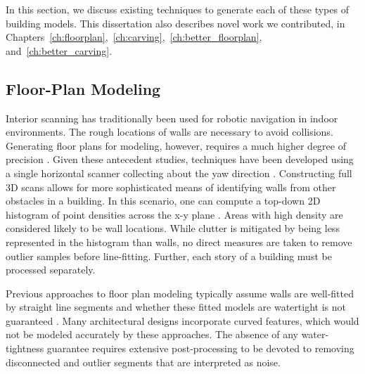 \documentclass[12pt,onecolumn,oneside]{book}
\begin{document}
In this section, we discuss existing techniques to generate each of these types of building models.  This dissertation also describes novel work we contributed, in Chapters~\ref{ch:floorplan},~\ref{ch:carving},~\ref{ch:better_floorplan}, and~\ref{ch:better_carving}.

\subsection{Floor-Plan Modeling}
\label{ssec:background_floorplan}

Interior scanning has traditionally been used for robotic navigation in indoor environments.  The rough locations of walls are necessary to avoid collisions.  Generating floor plans for modeling, however, requires a much higher degree of precision \cite{Okorn09}.  Given these antecedent studies, techniques have been developed using a single horizontal scanner collecting about the yaw direction \cite{Weiss05}.  Constructing full 3D scans allows for more sophisticated means of identifying walls from other obstacles in a building.  In this scenario, one can compute a top-down 2D histogram of point densities across the x-y plane \cite{Okorn09}.  Areas with high density are considered likely to be wall locations.  While clutter is mitigated by being less represented in the histogram than walls, no direct measures are taken to remove outlier samples before line-fitting.  Further, each story of a building must be processed separately.

Previous approaches to floor plan modeling typically assume walls are well-fitted by straight line segments and whether these fitted models are watertight is not guaranteed \cite{Nuchter03, Okorn09, Weiss05}.  Many architectural designs incorporate curved features, which would not be modeled accurately by these approaches. The absence of any water-tightness guarantee requires extensive post-processing to be devoted to removing disconnected and outlier segments that are interpreted as noise.
\end{document}

